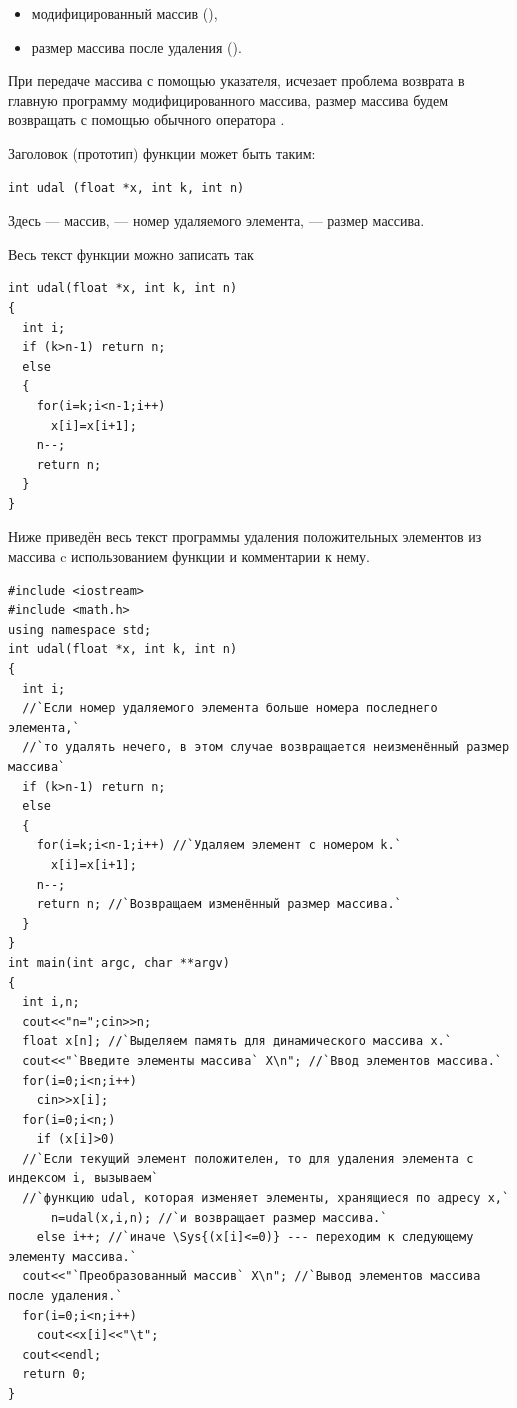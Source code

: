 \begin{itemize}
\item модифицированный массив (),
\item размер массива после удаления ().
\end{itemize}
При передаче массива с помощью указателя, исчезает проблема возврата в главную программу модифицированного массива,
размер массива будем возвращать с помощью обычного оператора .

Заголовок (прототип) функции  может быть таким:
\begin{lstlisting}
int udal (float *x, int k, int n)
\end{lstlisting}
Здесь  --- массив,  --- номер удаляемого элемента,  --- размер массива.

Весь текст функции можно записать так
\begin{lstlisting}
int udal(float *x, int k, int n)
{
  int i;
  if (k>n-1) return n;
  else
  {
    for(i=k;i<n-1;i++)
      x[i]=x[i+1];
    n--;
    return n;
  }
}
\end{lstlisting}

Ниже приведён весь текст программы удаления положительных элементов из массива  c использованием
функции  и комментарии к нему.
\begin{lstlisting}
#include <iostream>
#include <math.h>
using namespace std;
int udal(float *x, int k, int n)
{
  int i;
  //`Если номер удаляемого элемента больше номера последнего элемента,`
  //`то удалять нечего, в этом случае возвращается неизменённый размер массива`
  if (k>n-1) return n;
  else
  {
    for(i=k;i<n-1;i++) //`Удаляем элемент с номером k.`
      x[i]=x[i+1];
    n--;
    return n; //`Возвращаем изменённый размер массива.`
  }
}	
int main(int argc, char **argv)
{
  int i,n;
  cout<<"n=";cin>>n;
  float x[n]; //`Выделяем память для динамического массива x.`
  cout<<"`Введите элементы массива` X\n"; //`Ввод элементов массива.`
  for(i=0;i<n;i++)
    cin>>x[i];
  for(i=0;i<n;)
    if (x[i]>0)
  //`Если текущий элемент положителен, то для удаления элемента с индексом i, вызываем` 
  //`функцию udal, которая изменяет элементы, хранящиеся по адресу x,`
      n=udal(x,i,n); //`и возвращает размер массива.`
    else i++; //`иначе \Sys{(x[i]<=0)} --- переходим к следующему элементу массива.`
  cout<<"`Преобразованный массив` X\n"; //`Вывод элементов массива после удаления.`
  for(i=0;i<n;i++)
    cout<<x[i]<<"\t";
  cout<<endl;
  return 0;
}
\end{lstlisting}

